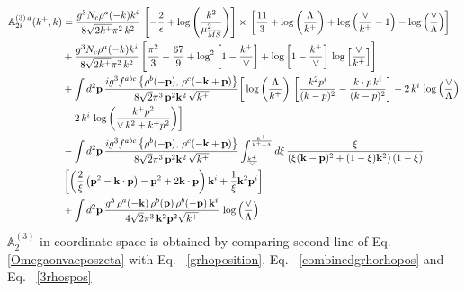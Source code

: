 \documentclass[aps,prd,amsmath,amssymb,nofootinbib]{revtex4-2}
\def\mf#1{\mathbb{#1}}
\numberwithin{equation}{section}
\begin{document}
\begin{align}
     \mf{A}^{(3)\, a}_{2i}(k^{+},k) & = \frac{g^{3}N_{c}\rho^{a}(-k)k^{i}}{8\sqrt{2k^{+}}\pi^{2}\,k^{2}}\,\left[-\frac{2}{\epsilon}+\log{\left(\frac{k^{2}}{\mu^{2}_{\overline{MS}}}\right)}\right]\times\, \left[\frac{11}{3}+\log{\left(\frac{\Lambda}{k^{+}}\right)}+\log{\left(\frac{\vee}{k^{+}}-1\right)}-\log{\left(\frac{\vee}{\Lambda}\right)}\right]\notag \\ & +\frac{g^{3}N_{c}\rho^{a}(-k)k^{i}}{8\sqrt{2k^{+}}\pi^{2}\,k^{2}}\, \Bigg[\frac{\pi^{2}}{3} - \frac{67}{9} + \log^{2}{\left[1-\frac{k^{+}}{\vee}\right]}+\log{\left[1-\frac{k^{+}}{\vee}\right]}\,\log{\left[\frac{\vee}{k^{+}}\right]}\Bigg]\notag \\ & +\int d^{2}\mathbf{p}\,\frac{ig^{3}f^{abc}\left\{ \rho^{b}(-\mathbf{p}),\,\rho^{c}(-\mathbf{k}+\mathbf{p})\right\}}{8\sqrt{2}\pi^{3}\,\mathbf{p}^{2}\mathbf{k}^{2}\,\sqrt{k^{+}}}\bigg[\log{\left(\frac{\Lambda}{k^{+}}\right)}\,\left[\frac{k^{2}p^{i}}{(k-p)^{2}}-\frac{k\cdot p\,k^{i}}{(k-p)^{2}}\right] -2\,k^{i}\,\log{\left(\frac{\vee}{\Lambda}\right)}\notag \\ &  -2\,k^{i}\,\log{\left(\frac{k^{+}p^{2}}{\vee\, k^{2}+k^{+}p^{2}}\right)}\bigg]\notag \\ &   - \int d^{2}\mathbf{p}\,\frac{ig^{3}f^{abc}\left\{ \rho^{b}(-\mathbf{p}),\,\rho^{c}(-\mathbf{k}+\mathbf{p})\right\}}{8\sqrt{2}\pi^{3}\,\mathbf{p}^{2}\mathbf{k}^{2}\,\sqrt{k^{+}}}\int_{\frac{k^{+}}{\vee}}^{\frac{k^{+}}{k^{+}+\Lambda}}d\xi\,\frac{\xi}{\left(\xi(\mathbf{k}-\mathbf{p})^{2}+(1-\xi)\mathbf{k}^{2}\right)(1-\xi)}\notag \\ & \left[\left(\frac{2}{\xi}\left(\mathbf{p}^{2}-\mathbf{k}\cdot\mathbf{p}\right)-\mathbf{p}^{2}+2\mathbf{k}\cdot\mathbf{p}\right)\mathbf{k}^{i} +\frac{1}{\xi}\mathbf{k}^{2}\mathbf{p}^{i}\right] \notag \\ & +\int d^{2}\mathbf{p}\,\frac{g^{3}\,\rho^{a}(-\mathbf{k})\,\rho^{b}(\mathbf{p})\,\rho^{b}(-\mathbf{p})\, \mathbf{k}^{i}}{4\sqrt{2}\pi^{3}\,\mathbf{k}^{2}\mathbf{p}^{2}\sqrt{k^{+}}}\,\log{\left(\frac{\vee}{\Lambda}\right)} 
\end{align}
$ \mf{A}^{(3)}_{2}$ in coordinate space is obtained by comparing second line of Eq.~ \eqref{Omegaonvacposzeta} with Eq.~ \eqref{grhoposition}, Eq.~ \eqref{combinedgrhorhopos} and Eq.~ \eqref{3rhospos}
\end{document}

